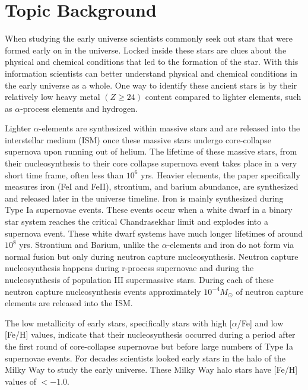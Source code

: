 \documentclass{aastex63}
\begin{document}
\section{Topic Background} \label{sec:background}

When studying the early universe scientists commonly seek out stars that were formed early on in the universe.
Locked inside these stars are clues about the physical and chemical conditions that led to the formation of the star.
With this information scientists can better understand physical and chemical conditions in the early universe as a whole.
One way to identify these ancient stars is by their relatively low heavy metal $\left(Z \geq 24\right)$ content compared to
lighter elements, such as $\alpha$-process elements and hydrogen.

Lighter $\alpha$-elements are synthesized within massive stars and are released into the interstellar medium (ISM) once these
massive stars undergo core-collapse supernova upon running out of helium. The lifetime of these massive stars, from their
nucleosynthesis to their core collapse supernova event takes place in a very short time frame, often less than $10^{6}$ yrs.
Heavier elements, the paper specifically measures iron (FeI and FeII), strontium, and barium abundance, are synthesized
and released later in the universe timeline. Iron is mainly synthesized during Type Ia supernovae events. These events occur
when a white dwarf in a binary star system reaches the critical Chandrasekhar limit and explodes into a supernova event.
These white dwarf systems have much longer lifetimes of around $10^{8}$ yrs.
Strontium and Barium, unlike the $\alpha$-elements and iron do not form via normal fusion but only during neutron capture
nucleosynthesis. Neutron capture nucleosynthesis happens during r-process supernovae and during the nucleosynthesis of
population III supermassive stars. During each of these neutron capture nucleosynthesis events approximately
$10^{-4} M_\odot$ of neutron capture elements are released into the ISM.

The low metallicity of early stars, specifically stars with high [$\alpha$/Fe] and low [Fe/H] values, indicate that their
nucleosynthesis occurred during a period after the first round of core-collapse supernovae but before large numbers of
Type Ia supernovae events. For decades scientists looked early stars in the halo of the Milky Way to study the early universe.
These Milky Way halo stars have [Fe/H] values of $< -1.0$.
\end{document}

